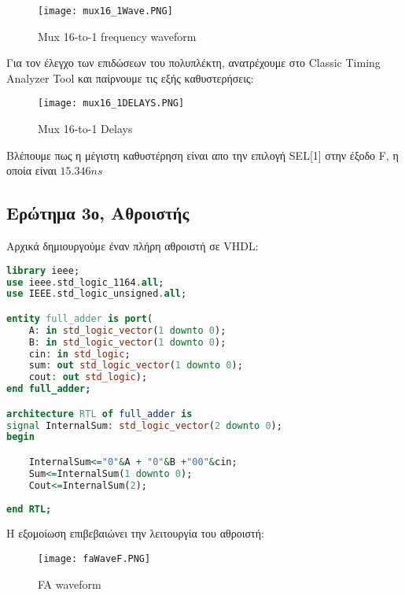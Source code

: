 \documentclass{article}
\begin{document}
\begin{figure}[h!]
  \caption{\foreignlanguage{english}{Mux 16-to-1 frequency waveform}}
\texttt{[image: mux16\_1Wave.PNG]}
\end{figure}

\clearpage

Για τον έλεγχο των επιδώσεων του πολυπλέκτη, ανατρέχουμε στο \foreignlanguage{english}{Classic Timing Analyzer Tool} και παίρνουμε τις εξής καθυστερήσεις:

\begin{figure}[h!]
  \caption{\foreignlanguage{english}{Mux 16-to-1 Delays}}
\texttt{[image: mux16\_1DELAYS.PNG]}
\end{figure}

Βλέπουμε πως η μέγιστη καθυστέρηση είναι απο την επιλογή \foreignlanguage{english}{SEL[1]} στην έξοδο \foreignlanguage{english}{F}, η οποία είναι $15.346ns$

\clearpage

\subsection{Ερώτημα 3ο, Αθροιστής}

Αρχικά δημιουργούμε έναν πλήρη αθροιστή σε \foreignlanguage{english}{VHDL}:

\begin{otherlanguage}{english}
\begin{lstlisting}[language=VHDL, caption= Full Adder]
library ieee;
use ieee.std_logic_1164.all;
use IEEE.std_logic_unsigned.all;

entity full_adder is port(
	A: in std_logic_vector(1 downto 0);
	B: in std_logic_vector(1 downto 0);
	cin: in std_logic;
	sum: out std_logic_vector(1 downto 0);
	cout: out std_logic);
end full_adder;

architecture RTL of full_adder is	
signal InternalSum: std_logic_vector(2 downto 0);
begin

	InternalSum<="0"&A + "0"&B +"00"&cin;
	Sum<=InternalSum(1 downto 0);
	Cout<=InternalSum(2);
	
end RTL;
\end{lstlisting}
\end{otherlanguage}

Η εξομοίωση επιβεβαιώνει την λειτουργία του αθροιστή:

\begin{figure}[h!]
  \caption{\foreignlanguage{english}{FA waveform}}
\texttt{[image: faWaveF.PNG]}
\end{figure}
\end{document}
